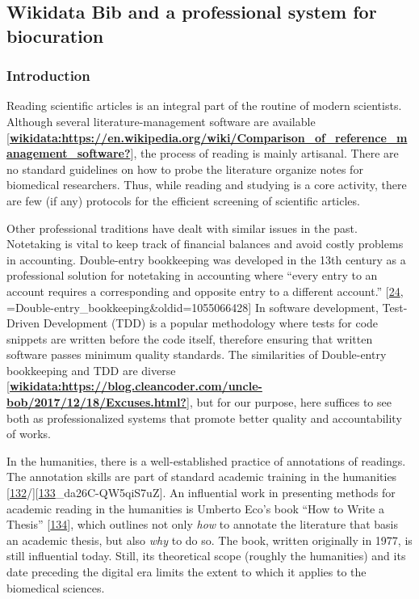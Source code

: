 \hypertarget{wikidata-bib-and-a-professional-system-for-biocuration}{%
\subsection{Wikidata Bib and a professional system for biocuration}\label{wikidata-bib-and-a-professional-system-for-biocuration}}

\hypertarget{introduction-1}{%
\subsubsection{Introduction}\label{introduction-1}}

Reading scientific articles is an integral part of the routine of modern scientists.
Although several literature-management software are available {[}\protect\hyperlink{ref-wikidata:https:ux2fux2fen.wikipedia.orgux2fwikiux2fComparison_of_reference_management_software}{\textbf{wikidata:https://en.wikipedia.org/wiki/Comparison\_of\_reference\_management\_software?}}{]}, the process of reading is mainly artisanal.
There are no standard guidelines on how to probe the literature organize notes for biomedical researchers.
Thus, while reading and studying is a core activity, there are few (if any) protocols for the efficient screening of scientific articles.

Other professional traditions have dealt with similar issues in the past.
Notetaking is vital to keep track of financial balances and avoid costly problems in accounting.
Double-entry bookkeeping was developed in the 13th century as a professional solution for notetaking in accounting where ``every entry to an account requires a corresponding and opposite entry to a different account.'' {[}\protect\hyperlink{ref-uYuz0opI}{24}, =Double-entry\_bookkeeping\&oldid=1055066428{]}
In software development, Test-Driven Development (TDD) is a popular methodology where tests for code snippets are written before the code itself, therefore ensuring that written software passes minimum quality standards.
The similarities of Double-entry bookkeeping and TDD are diverse {[}\protect\hyperlink{ref-wikidata:https:ux2fux2fblog.cleancoder.comux2funcle-bobux2f2017ux2f12ux2f18ux2fExcuses.html}{\textbf{wikidata:https://blog.cleancoder.com/uncle-bob/2017/12/18/Excuses.html?}}{]}, but for our purpose, here suffices to see both as professionalized systems that promote better quality and accountability of works.

In the humanities, there is a well-established practice of annotations of readings.
The annotation skills are part of standard academic training in the humanities {[}\protect\hyperlink{ref-rPKBwmYh}{132}/{]}{[}\protect\hyperlink{ref-PKhuVRW8}{133}\_da26C-QW5qiS7uZ{]}.
An influential work in presenting methods for academic reading in the humanities is Umberto Eco's book ``How to Write a Thesis'' {[}\protect\hyperlink{ref-1HBVPtZGp}{134}{]}, which outlines not only \emph{how} to annotate the literature that basis an academic thesis, but also \emph{why} to do so.
The book, written originally in 1977, is still influential today.
Still, its theoretical scope (roughly the humanities) and its date preceding the digital era limits the extent to which it applies to the biomedical sciences.

